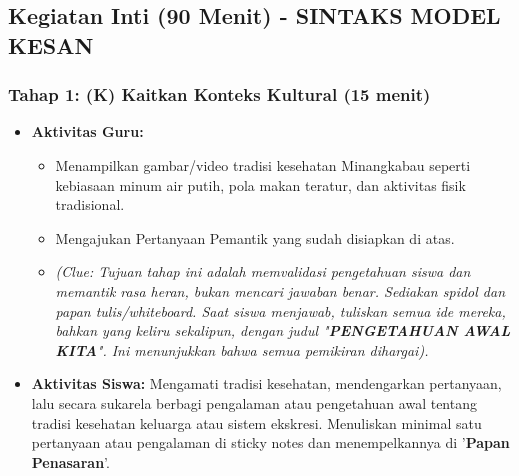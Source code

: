 \documentclass[a4paper,12pt]{article}
\begin{document}
\subsection{Kegiatan Inti (90 Menit) - SINTAKS MODEL KESAN}

\subsubsection{Tahap 1: (K) Kaitkan Konteks Kultural (15 menit)}
\begin{itemize}
\item \textbf{Aktivitas Guru:}
    \begin{itemize}
    \item Menampilkan gambar/video tradisi kesehatan Minangkabau seperti kebiasaan minum air putih, pola makan teratur, dan aktivitas fisik tradisional.
    \item Mengajukan Pertanyaan Pemantik yang sudah disiapkan di atas.
    \item \textit{(Clue: Tujuan tahap ini adalah memvalidasi pengetahuan siswa dan memantik rasa heran, bukan mencari jawaban benar. Sediakan spidol dan papan tulis/whiteboard. Saat siswa menjawab, tuliskan semua ide mereka, bahkan yang keliru sekalipun, dengan judul "\textbf{PENGETAHUAN AWAL KITA}". Ini menunjukkan bahwa semua pemikiran dihargai).}
    \end{itemize}
\item \textbf{Aktivitas Siswa:} Mengamati tradisi kesehatan, mendengarkan pertanyaan, lalu secara sukarela berbagi pengalaman atau pengetahuan awal tentang tradisi kesehatan keluarga atau sistem ekskresi. Menuliskan minimal satu pertanyaan atau pengalaman di sticky notes dan menempelkannya di '\textbf{Papan Penasaran}'.
\end{itemize}
\end{document}
